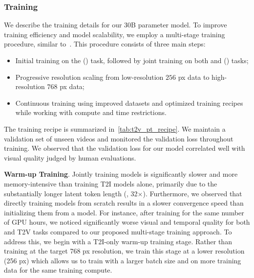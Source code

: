 \subsubsection{Training}
We describe the training details for our 30B parameter model.
To improve training efficiency and model scalability, we employ a multi-stage training procedure, similar to~\citep{emuvideo2023}.
This procedure consists of three main steps:
\begin{itemize}
    \item Initial training on the \textToI (\textToIShort) task, followed by joint training on both \textToI and \textToV (\textToVShort) tasks;
    \item Progressive resolution scaling from low-resolution $256$ px data to high-resolution $768$ px data;
    \item Continuous training using improved datasets and optimized training recipes while working with compute and time restrictions.
\end{itemize}
The training recipe is summarized in~\cref{tab:t2v_pt_recipe}.
We maintain a validation set of unseen videos and monitored the validation loss throughout training.
We observed that the validation loss for our model correlated well with visual quality judged by human evaluations.

\noindent \textbf{\TextToI Warm-up Training}.
Jointly training \textToIVShort models is significantly slower and more memory-intensive than training T2I models alone, primarily due to the substantially longer latent token length (\eg, 32$\times$).
Furthermore, we observed that directly training \textToIVShort models from scratch results in a slower convergence speed than initializing them from a \textToIShort model.
For instance, after training for the same number of GPU hours, we noticed significantly worse visual and temporal quality for both \textToIShort and T2V tasks compared to our proposed multi-stage training approach.
To address this, we begin with a T2I-only warm-up training stage.
Rather than training at the target 768 px resolution, we train this stage at a lower resolution (256 px) which allows us to train with a larger batch size and on more training data for the same training compute.








